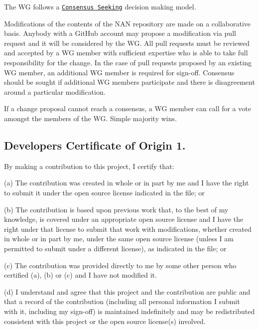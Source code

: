 The WG follows a \href{http://en.wikipedia.org/wiki/Consensus-seeking_decision-making}{\tt Consensus Seeking} decision making model.

Modifications of the contents of the N\+AN repository are made on a collaborative basis. Anybody with a Git\+Hub account may propose a modification via pull request and it will be considered by the WG. All pull requests must be reviewed and accepted by a WG member with sufficient expertise who is able to take full responsibility for the change. In the case of pull requests proposed by an existing WG member, an additional WG member is required for sign-\/off. Consensus should be sought if additional WG members participate and there is disagreement around a particular modification.

If a change proposal cannot reach a consensus, a WG member can call for a vote amongst the members of the WG. Simple majority wins.

\subsection*{Developer\textquotesingle{}s Certificate of Origin 1.}

By making a contribution to this project, I certify that\+:


\begin{DoxyItemize}
\item (a) The contribution was created in whole or in part by me and I have the right to submit it under the open source license indicated in the file; or
\item (b) The contribution is based upon previous work that, to the best of my knowledge, is covered under an appropriate open source license and I have the right under that license to submit that work with modifications, whether created in whole or in part by me, under the same open source license (unless I am permitted to submit under a different license), as indicated in the file; or
\item (c) The contribution was provided directly to me by some other person who certified (a), (b) or (c) and I have not modified it.
\item (d) I understand and agree that this project and the contribution are public and that a record of the contribution (including all personal information I submit with it, including my sign-\/off) is maintained indefinitely and may be redistributed consistent with this project or the open source license(s) involved.
\end{DoxyItemize}

